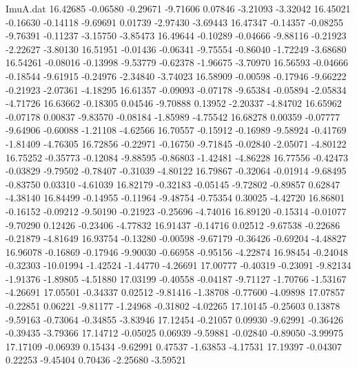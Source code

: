 \begin{filecontents}{ImuA.dat}
  16.42685   -0.06580   -0.29671   -9.71606    0.07846   -3.21093   -3.32042
  16.45021   -0.16630   -0.14118   -9.69691    0.01739   -2.97430   -3.69443
  16.47347   -0.14357   -0.08255   -9.76391   -0.11237   -3.15750   -3.85473
  16.49644   -0.10289   -0.04666   -9.88116   -0.21923   -2.22627   -3.80130
  16.51951   -0.01436   -0.06341   -9.75554   -0.86040   -1.72249   -3.68680
  16.54261   -0.08016   -0.13998   -9.53779   -0.62378   -1.96675   -3.70970
  16.56593   -0.04666   -0.18544   -9.61915   -0.24976   -2.34840   -3.74023
  16.58909   -0.00598   -0.17946   -9.66222   -0.21923   -2.07361   -4.18295
  16.61357   -0.09093   -0.07178   -9.65384   -0.05894   -2.05834   -4.71726
  16.63662   -0.18305    0.04546   -9.70888    0.13952   -2.20337   -4.84702
  16.65962   -0.07178    0.00837   -9.83570   -0.08184   -1.85989   -4.75542
  16.68278    0.00359   -0.07777   -9.64906   -0.60088   -1.21108   -4.62566
  16.70557   -0.15912   -0.16989   -9.58924   -0.41769   -1.81409   -4.76305
  16.72856   -0.22971   -0.16750   -9.71845   -0.02840   -2.05071   -4.80122
  16.75252   -0.35773   -0.12084   -9.88595   -0.86803   -1.42481   -4.86228
  16.77556   -0.42473   -0.03829   -9.79502   -0.78407   -0.31039   -4.80122
  16.79867   -0.32064   -0.01914   -9.68495   -0.83750    0.03310   -4.61039
  16.82179   -0.32183   -0.05145   -9.72802   -0.89857    0.62847   -4.38140
  16.84499   -0.14955   -0.11964   -9.48754   -0.75354    0.30025   -4.42720
  16.86801   -0.16152   -0.09212   -9.50190   -0.21923   -0.25696   -4.74016
  16.89120   -0.15314   -0.01077   -9.70290    0.12426   -0.23406   -4.77832
  16.91437   -0.14716    0.02512   -9.67538   -0.22686   -0.21879   -4.81649
  16.93754   -0.13280   -0.00598   -9.67179   -0.36426   -0.69204   -4.48827
  16.96078   -0.16869   -0.17946   -9.90030   -0.66958   -0.95156   -4.22874
  16.98454   -0.24048   -0.32303  -10.01994   -1.42524   -1.44770   -4.26691
  17.00777   -0.40319   -0.23091   -9.82134   -1.91376   -1.89805   -4.51880
  17.03199   -0.40558   -0.04187   -9.71127   -1.70766   -1.53167   -4.26691
  17.05501   -0.34337    0.02512   -9.81416   -1.38708   -0.77600   -4.09898
  17.07857   -0.22851    0.06221   -9.81177   -1.24968   -0.31802   -4.02265
  17.10145   -0.25603    0.13878   -9.59163   -0.73064   -0.34855   -3.83946
  17.12454   -0.21057    0.09930   -9.62991   -0.36426   -0.39435   -3.79366
  17.14712   -0.05025    0.06939   -9.59881   -0.02840   -0.89050   -3.99975
  17.17109   -0.06939    0.15434   -9.62991    0.47537   -1.63853   -4.17531
  17.19397   -0.04307    0.22253   -9.45404    0.70436   -2.25680   -3.59521

\end{filecontents}
